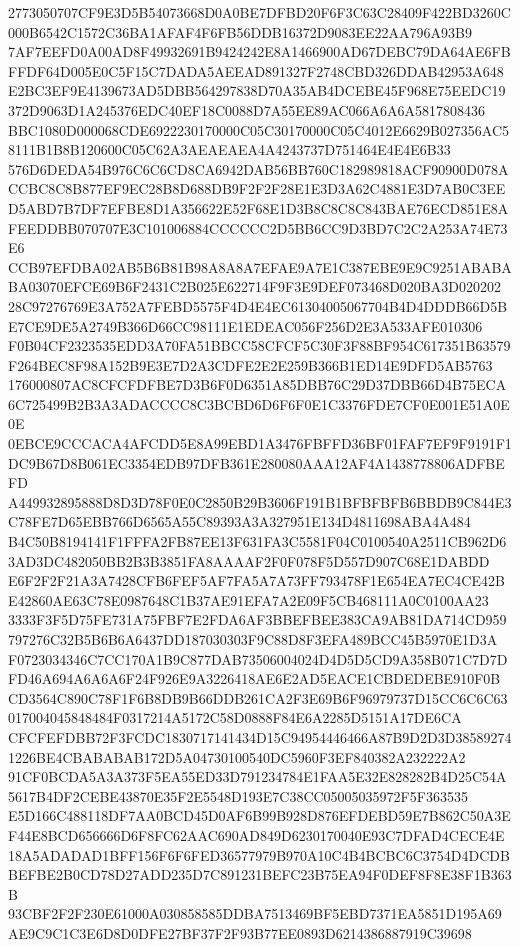 \documentclass[UTF8,fontset=fandol,zihao=-4,a4paper]{ctexart}
\begin{document}
{{2773050707CF9E3D5B54073668D0A0BE7DFBD20F6F3C63C28409F422BD3260C000B6542C1572C36BA1AFAF4F6FB56DDB16372D9083EE22AA796A93B9
7AF7EEFD0A00AD8F49932691B9424242E8A1466900AD67DEBC79DA64AE6FBFFDF64D005E0C5F15C7DADA5AEEAD891327F2748CBD326DDAB42953A648
E2BC3EF9E4139673AD5DBB564297838D70A35AB4DCEBE45F968E75EEDC19372D9063D1A245376EDC40EF18C0088D7A55EE89AC066A6A6A5817808436
BBC1080D000068CDE6922230170000C05C30170000C05C4012E6629B027356AC58111B1B8B120600C05C62A3AEAEAEA4A4243737D751464E4E4E6B33
576D6DEDA54B976C6C6CD8CA6942DAB56BB760C182989818ACF90900D078ACCBC8C8B877EF9EC28B8D688DB9F2F2F28E1E3D3A62C4881E3D7AB0C3EE
D5ABD7B7DF7EFBE8D1A356622E52F68E1D3B8C8C8C843BAE76ECD851E8AFEEDDBB070707E3C101006884CCCCCC2D5BB6CC9D3BD7C2C2A253A74E73E6
CCB97EFDBA02AB5B6B81B98A8A8A7EFAE9A7E1C387EBE9E9C9251ABABABA03070EFCE69B6F2431C2B025E622714F9F3E9DEF073468D020BA3D020202
28C97276769E3A752A7FEBD5575F4D4E4EC61304005067704B4D4DDDB66D5BE7CE9DE5A2749B366D66CC98111E1EDEAC056F256D2E3A533AFE010306
F0B04CF2323535EDD3A70FA51BBCC58CFCF5C30F3F88BF954C617351B63579F264BEC8F98A152B9E3E7D2A3CDFE2E2E259B366B1ED14E9DFD5AB5763
176000807AC8CFCFDFBE7D3B6F0D6351A85DBB76C29D37DBB66D4B75ECA6C725499B2B3A3ADACCCC8C3BCBD6D6F6F0E1C3376FDE7CF0E001E51A0E0E
0EBCE9CCCACA4AFCDD5E8A99EBD1A3476FBFFD36BF01FAF7EF9F9191F1DC9B67D8B061EC3354EDB97DFB361E280080AAA12AF4A1438778806ADFBEFD
A449932895888D8D3D78F0E0C2850B29B3606F191B1BFBFBFB6BBDB9C844E3C78FE7D65EBB766D6565A55C89393A3A327951E134D4811698ABA4A484
B4C50B8194141F1FFFA2FB87EE13F631FA3C5581F04C0100540A2511CB962D63AD3DC482050BB2B3B3851FA8AAAAF2F0F078F5D557D907C68E1DABDD
E6F2F2F21A3A7428CFB6FEF5AF7FA5A7A73FF793478F1E654EA7EC4CE42BE42860AE63C78E0987648C1B37AE91EFA7A2E09F5CB468111A0C0100AA23
3333F3F5D75FE731A75FBF7E2FDA6AF3BBEFBEE383CA9AB81DA714CD959797276C32B5B6B6A6437DD187030303F9C88D8F3EFA489BCC45B5970E1D3A
F0723034346C7CC170A1B9C877DAB73506004024D4D5D5CD9A358B071C7D7DFD46A694A6A6A6F24F926E9A3226418AE6E2AD5EACE1CBDEDEBE910F0B
CD3564C890C78F1F6B8DB9B66DDB261CA2F3E69B6F96979737D15CC6C6C63017004045848484F0317214A5172C58D0888F84E6A2285D5151A17DE6CA
CFCFEFDBB72F3FCDC1830717141434D15C94954446466A87B9D2D3D385892741226BE4CBABABAB172D5A04730100540DC5960F3EF840382A232222A2
91CF0BCDA5A3A373F5EA55ED33D791234784E1FAA5E32E828282B4D25C54A5617B4DF2CEBE43870E35F2E5548D193E7C38CC05005035972F5F363535
E5D166C488118DF7AA0BCD45D0AF6B99B928D876EFDEBD59E7B862C50A3EF44E8BCD656666D6F8FC62AAC690AD849D6230170040E93C7DFAD4CECE4E
18A5ADADAD1BFF156F6F6FED36577979B970A10C4B4BCBC6C3754D4DCDBBEFBE2B0CD78D27ADD235D7C891231BEFC23B75EA94F0DEF8F8E38F1B363B
93CBF2F2F230E61000A030858585DDBA7513469BF5EBD7371EA5851D195A69AE9C9C1C3E6D8D0DFE27BF37F2F93B77EE0893D6214386887919C39698
}}
\end{document}
